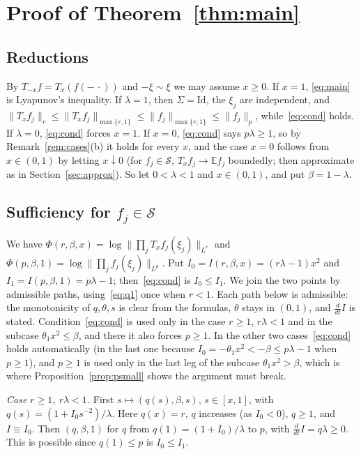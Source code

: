 \documentclass[11pt]{amsart}
\theoremstyle{definition}
\newcommand{\E}{\mathbb{E}}
\newcommand{\cS}{\mathcal{S}}
\newcommand{\Id}{\mathrm{Id}}
\begin{document}
\section{Proof of Theorem~\ref{thm:main}}
\subsection{Reductions}
By $T_{-x}f=T_x(f(-\,\cdot))$ and $-\xi\sim\xi$ we may assume $x\ge0$. If $x=1$, \eqref{eq:main} is Lyapunov's
inequality. If $\lambda=1$, then $\Sigma=\Id$, the $\xi_j$ are independent, and $\|T_xf_j\|_r\le
\|T_xf_j\|_{\max\{r,1\}}\le\|f_j\|_{\max\{r,1\}}\le\|f_j\|_p$, while~\eqref{eq:cond} holds. If $\lambda=0$,
\eqref{eq:cond} forces $x=1$. If $x=0$, \eqref{eq:cond} says $p\lambda\ge1$, so by Remark~\ref{rem:cases}(b) it holds
for every $x$, and the case $x=0$ follows from $x\in(0,1)$ by letting $x\downarrow0$ (for $f_j\in\cS$,
$T_xf_j\to\E f_j$ boundedly; then approximate as in Section~\ref{sec:approx}). So let $0<\lambda<1$ and
$x\in(0,1)$, and put $\beta=1-\lambda$.

\subsection{Sufficiency for \texorpdfstring{$f_j\in\cS$}{smooth f}}
We have $\Phi(r,\beta,x)=\log\|\prod_jT_xf_j(\xi_j)\|_{L^r}$ and $\Phi(p,\beta,1)=\log\|\prod_jf_j(\xi_j)\|_{L^p}$. Put
$I_0=I(r,\beta,x)=(r\lambda-1)x^2$ and $I_1=I(p,\beta,1)=p\lambda-1$; then~\eqref{eq:cond} is $I_0\le I_1$. We join
the two points by admissible paths, using~\eqref{eq:q1} once when $r<1$. Each path below is admissible: the
monotonicity of $q,\theta,s$ is clear from the formulas, $\theta$ stays in $(0,1)$, and $\frac{d}{dt}I$ is stated.
Condition~\eqref{eq:cond} is used only in the case $r\ge1$, $r\lambda<1$ and in the subcase $\theta_1x^2\le\beta$, and
there it also forces $p\ge1$. In the other two cases~\eqref{eq:cond} holds automatically (in the last one because
$I_0=-\theta_1x^2<-\beta\le p\lambda-1$ when $p\ge1$), and $p\ge1$ is used only in the last leg of the subcase
$\theta_1x^2>\beta$, which is where Proposition~\ref{prop:psmall} shows the argument must break.

\emph{Case $r\ge1$, $r\lambda<1$.} First $s\mapsto(q(s),\beta,s)$, $s\in[x,1]$, with $q(s)=(1+I_0s^{-2})/\lambda$.
Here $q(x)=r$, $q$ increases (as $I_0<0$), $q\ge1$, and $I\equiv I_0$. Then $(q,\beta,1)$ for $q$ from
$q(1)=(1+I_0)/\lambda$ to $p$, with $\frac{d}{dt}I=\dot q\lambda\ge0$. This is possible since $q(1)\le p$ is
$I_0\le I_1$.
\end{document}
